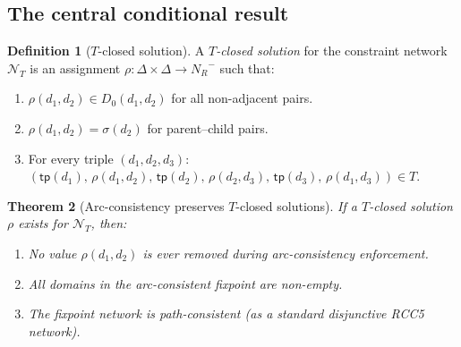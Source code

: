 \documentclass[a4paper,11pt]{article}
\newtheorem{theorem}{Theorem}[section]
\theoremstyle{definition}
\newtheorem{definition}[theorem]{Definition}
\newcommand{\NR}{\ensuremath{N_R}}
\begin{document}
\subsection{The central conditional result}

\begin{definition}[$T$-closed solution]
\label{def:t-closed}
A \emph{$T$-closed solution} for the constraint network
$\mathcal{N}_T$ is an assignment $\rho \colon \Delta \times \Delta
\to \NR^{-}$ such that:
\begin{enumerate}[nosep,label=(\roman*)]
  \item $\rho(d_1, d_2) \in D_0(d_1, d_2)$ for all non-adjacent pairs.
  \item $\rho(d_1, d_2) = \sigma(d_2)$ for parent--child pairs.
  \item For every triple $(d_1, d_2, d_3)$:
    $(\mathsf{tp}(d_1),\, \rho(d_1,d_2),\, \mathsf{tp}(d_2),\,
     \rho(d_2,d_3),\, \mathsf{tp}(d_3),\, \rho(d_1,d_3)) \in T$.
\end{enumerate}
\end{definition}

\begin{theorem}[Arc-consistency preserves $T$-closed solutions]
\label{thm:ac-preservation}
If a $T$-closed solution $\rho$ exists for $\mathcal{N}_T$, then:
\begin{enumerate}[nosep,label=(\alph*)]
  \item No value $\rho(d_1, d_2)$ is ever removed during
    arc-consistency enforcement.
  \item All domains in the arc-consistent fixpoint are non-empty.
  \item The fixpoint network is path-consistent \textup{(}as a
    standard disjunctive RCC5 network\textup{)}.
\end{enumerate}
\end{theorem}
\end{document}
